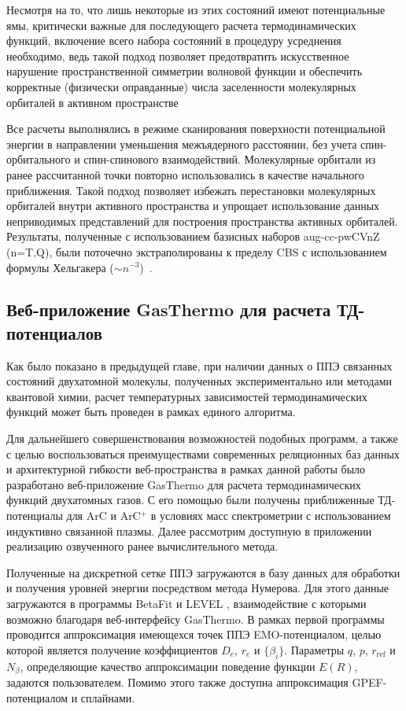 \documentclass[12pt]{extarticle}
\begin{document}
	Несмотря на то, что лишь некоторые из этих состояний имеют потенциальные ямы, критически важные для последующего расчета термодинамических функций, включение всего набора состояний в процедуру усреднения необходимо, ведь такой подход позволяет предотвратить искусственное нарушение пространственной симметрии волновой функции и обеспечить корректные (физически оправданные) числа заселенности молекулярных орбиталей в активном пространстве
	
	Все расчеты выполнялись в режиме сканирования поверхности потенциальной энергии в направлении уменьшения межъядерного расстоянии, без учета спин-орбитального и спин-спинового взаимодействий. Молекулярные орбитали из ранее рассчитанной точки повторно использовались в качестве начального приближения. Такой подход позволяет избежать перестановки молекулярных орбиталей внутри активного пространства и упрощает использование данных неприводимых представлений для построения пространства активных орбиталей. Результаты, полученные с использованием базисных наборов aug-cc-pwCVnZ (n=T,Q), были поточечно экстраполированы к пределу CBS с использованием формулы Хельгакера ($\sim n^{-3}$)~\cite{helgaker_cbs}.
	
	    \subsection{Веб-приложение GasThermo для расчета ТД-потенциалов}
	\label{sec:Chapter2.3}
	
	Как было показано в предыдущей главе, при наличии данных о ППЭ связанных состояний двухатомной молекулы, полученных экспериментально или методами квантовой химии, расчет температурных зависимостей термодинамических функций может быть проведен в рамках единого алгоритма.
	
	Для дальнейшего совершенствования возможностей подобных программ, а также с целью воспользоваться преимуществами современных реляционных баз данных и архитектурной гибкости веб-пространства в рамках данной работы было разработано веб-приложение GasThermo \cite{gasthermo} для расчета термодинамических функций двухатомных газов. С его помощью были получены приближенные ТД-потенциалы для ArC и ArC$^+$ в условиях масс спектрометрии с использованием индуктивно связанной плазмы. Далее рассмотрим доступную в приложении реализацию озвученного ранее вычислительного метода.
	
	Полученные на дискретной сетке ППЭ загружаются в базу данных для обработки и получения уровней энергии посредством метода Нумерова. Для этого данные загружаются в программы BetaFit \cite{le_roy_betafit} и LEVEL \cite{le_roy_level}, взаимодействие с которыми возможно благодаря веб-интерфейсу GasThermo. В рамках первой программы проводится аппроксимация имеющехся точек ППЭ EMO-потенциалом, целью которой является получение коэффициентов $D_e$, $r_e$ и $\{ \beta_i\}$. Параметры $q$, $p$, $r_\text{ref}$ и $N_\beta$, определяющие качество аппроксимации поведение функции $E(R)$, задаются пользователем. Помимо этого также доступна аппроксимация GPEF-потенциалом и сплайнами.
	
\end{document}
